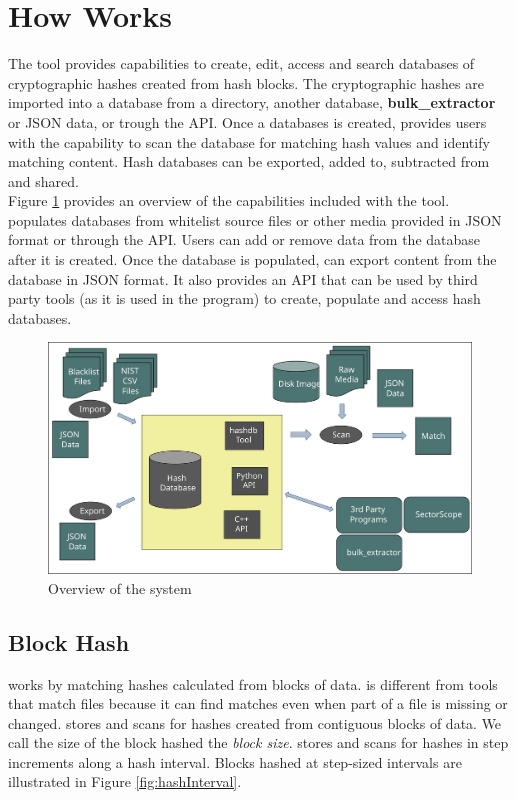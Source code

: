 \documentclass[11pt,fleqn]{article} %
\begin{document}
\section{How \hdb Works}
The \hdb tool provides capabilities to create, edit, access and search databases of cryptographic hashes created from hash blocks. The cryptographic hashes are imported into a database from a directory, another database, \textbf{bulk\_extractor} or JSON data, or trough the \hdb API.
Once a databases is created, \hdb provides users with the capability to scan the database for matching hash values and identify matching content. Hash databases can be exported, added to, subtracted from and shared.\\


Figure \ref{fig:overviewFigure} provides an overview of the capabilities included with the \hdb tool. \hdb populates databases from whitelist source files
or other media provided in JSON format or through the API.
Users can add or remove data from the database after it is created.
Once the database is populated, \hdb can export content from the database in JSON format. It also provides an API that can be used by third party tools (as it is used in the \bulk program) to create, populate and access hash databases.\\

\begin{figure}
	\center
	\includegraphics[scale=.45]{drawings/hashdb_system_overview}
	\caption{Overview of the \hdb system}
	\label{fig:overviewFigure}
\end{figure}

\subsection{Block Hash}
\hdb works by matching hashes calculated from blocks of data.  \hdb is different from tools that match files because it can find matches even when part of a file is missing or changed.  \hdb stores and scans for hashes created from contiguous blocks of data.  We call the size of the block hashed the \textit{block size}.  \hdb stores and scans for hashes in step increments along a hash interval. Blocks hashed at step-sized intervals are illustrated in Figure \ref{fig:hashInterval}.\\
\end{document}
